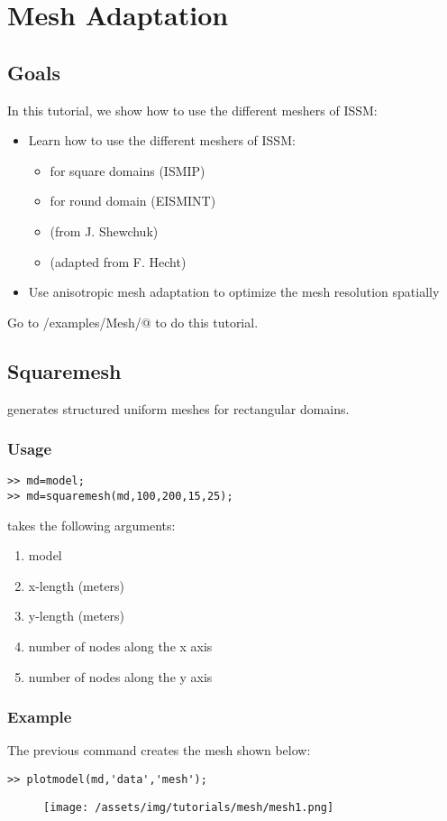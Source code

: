 \section{Mesh Adaptation}
\subsection{Goals} %
In this tutorial, we show how to use the different meshers of ISSM:
\begin{itemize}
	\item Learn how to use the different meshers of ISSM:
		\begin{itemize}
			\item \verb@squaremesh@ for square domains (ISMIP)
			\item \verb@roundmesh@ for round domain (EISMINT)
			\item \verb@triangle@ (from J. Shewchuk)
			\item \verb@bamg@ (adapted from F. Hecht)
		\end{itemize}
	\item Use anisotropic mesh adaptation to optimize the mesh resolution spatially
\end{itemize}
Go to \verb@trunk/examples/Mesh/@ to do this tutorial.
\subsection{Squaremesh}%
\verb@squaremesh@ generates structured uniform meshes for rectangular domains.
\subsubsection{Usage}
\begin{verbatim}>> md=model;
>> md=squaremesh(md,100,200,15,25);
\end{verbatim}
\verb@squaremesh@ takes the following arguments:
\begin{enumerate}
	\item model
	\item x-length (meters)
	\item y-length (meters)
	\item number of nodes along the x axis
	\item number of nodes along the y axis
\end{enumerate}
\subsubsection{Example}
The previous command creates the mesh shown below:
\begin{verbatim}>> plotmodel(md,'data','mesh');\end{verbatim}
\begin{figure}[H]
	\begin{center}
		\texttt{[image: /assets/img/tutorials/mesh/mesh1.png]}
	\end{center}
\end{figure}
